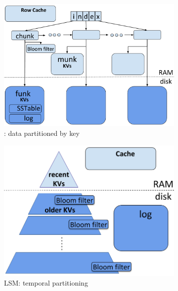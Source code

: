 \begin{figure}[tb]
\begin{subfigure}{0.34\linewidth}
\includegraphics[width=\columnwidth]{PiWi.png}
\caption{\sys: data partitioned by key}
\label{fig:piwi}
\end{subfigure}
\hspace{1mm}
\begin{subfigure}{0.3\linewidth}
\includegraphics[width=\textwidth]{LSM.png}
\caption{LSM: temporal partitioning}
\label{fig:lsm}
\end{subfigure}
\hspace{1mm}
\begin{subfigure}{0.3\linewidth}

\end{subfigure}
\end{figure}
